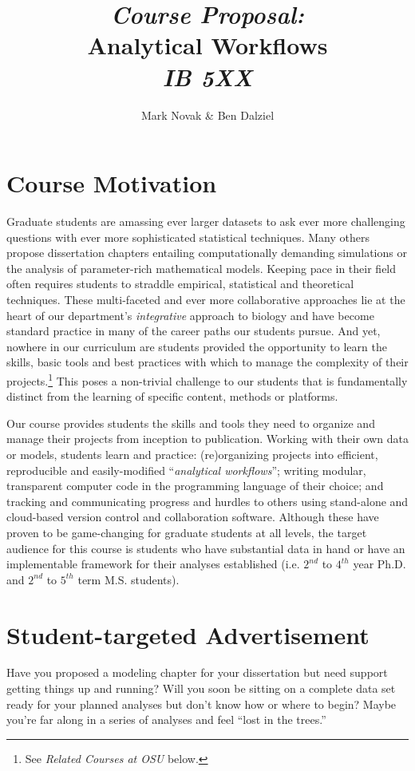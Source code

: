 \documentclass[10pt]{article}
\author{Mark Novak \& Ben Dalziel}
\title{\emph{Course Proposal:}\\Analytical Workflows\\\emph{IB 5XX}}
\date{}
\begin{document}
\maketitle

\section*{Course Motivation}
Graduate students are amassing ever larger datasets to ask ever more challenging questions with ever 
more sophisticated  statistical techniques. 
Many others propose dissertation chapters entailing computationally demanding simulations or the 
analysis of parameter-rich mathematical models. 
Keeping pace in their field often requires students to straddle empirical, statistical and theoretical 
techniques. 
These multi-faceted and ever more collaborative approaches lie at the heart of our 
department's \emph{integrative} approach to biology and have become standard practice in many of the 
career paths our students pursue.
And yet, nowhere in our curriculum are students provided the opportunity to learn the skills, basic tools 
and best practices with which to manage the complexity of their projects.\footnote{See \emph{Related 
Courses at OSU} below.}
This poses a non-trivial challenge to our students that is fundamentally distinct from the learning of 
specific content, methods or platforms.

Our course provides students the skills and tools they need to organize and manage their projects from 
inception to publication.  
Working with their own data or models, students learn and practice: (re)organizing projects into 
efficient, reproducible and easily-modified ``\emph{analytical workflows}''; 
writing modular, transparent computer code in the programming language of their choice;
and tracking and communicating progress and hurdles to others using stand-alone and cloud-based 
version control and collaboration software.
Although these have proven to be game-changing for graduate students at all levels, the 
target audience for this course is students who have substantial data in hand or have an 
implementable framework for their analyses established (i.e. $2^{nd}$ to $4^{th}$ year Ph.D. and 
$2^{nd}$ to $5^{th}$ term M.S. students).

\section*{Student-targeted Advertisement}
Have you proposed a modeling chapter for your dissertation but need support getting things up and 
running?  
Will you soon be sitting on a complete data set ready for your planned analyses but don't know how or 
where to begin?
Maybe you're far along in a series of analyses and feel ``lost in the trees.''
\end{document}
